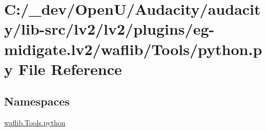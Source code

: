 \hypertarget{lv2_2plugins_2eg-midigate_8lv2_2waflib_2_tools_2python_8py}{}\section{C\+:/\+\_\+dev/\+Open\+U/\+Audacity/audacity/lib-\/src/lv2/lv2/plugins/eg-\/midigate.lv2/waflib/\+Tools/python.py File Reference}
\label{lv2_2plugins_2eg-midigate_8lv2_2waflib_2_tools_2python_8py}
\subsection*{Namespaces}
\begin{DoxyCompactItemize}
\item 
 \hyperlink{namespacewaflib_1_1_tools_1_1python}{waflib.\+Tools.\+python}
\end{DoxyCompactItemize}
